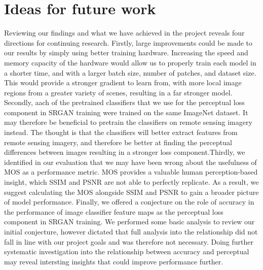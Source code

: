 \section{Ideas for future work}
Reviewing our findings and what we have achieved in the project reveals four directions for continuing research. Firstly, large improvements could be made to our results by simply using better training hardware. Increasing the speed and memory capacity of the hardware would allow us to properly train each model in a shorter time, and with a larger batch size, number of patches, and dataset size. This would provide a stronger gradient to learn from, with more local image regions from a greater variety of scenes, resulting in a far stronger model. Secondly, aach of the pretrained classifiers that we use for the perceptual loss component in SRGAN training were trained on the same ImageNet dataset. It may therefore be beneficial to pretrain the classifiers on remote sensing imagery instead. The thought is that the classifiers will better extract features from remote sensing imagery, and therefore be better at finding the perceptual differences between images resulting in a stronger loss component.Thirdly, we identified in our evaluation that we may have been wrong about the usefulness of MOS as a performance metric. MOS provides a valuable human perception-based insight, which SSIM and PSNR are not able to perfectly replicate. As a result, we suggest calculating the MOS alongside SSIM and PSNR to gain a broader picture of model performance. Finally, we offered a conjecture on the role of accuracy in the performance of image classifier feature maps as the perceptual loss component in SRGAN training. We performed some basic analysis to review our initial conjecture, however dictated that full analysis into the relationship did not fall in line with our project goals and was therefore not necessary. Doing further systematic investigation into the relationship between accuracy and perceptual may reveal intersting insights that could improve performance further.